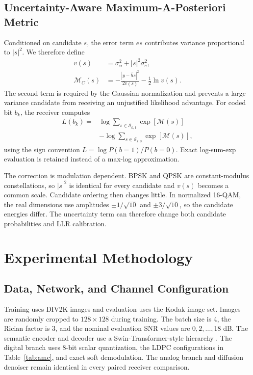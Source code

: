 \documentclass[conference]{IEEEtran}
\newcommand{\LLR}{LLR}
\newcommand{\LDPC}{LDPC}
\begin{document}
\subsection{Uncertainty-Aware Maximum-A-Posteriori Metric}
Conditioned on candidate $s$, the error term $es$ contributes variance proportional to $|s|^2$. We therefore define
\begin{align}
    v(s) &= \sigma_n^2+|s|^2\sigma_e^2,\\
    \mathcal M_C(s)
    &=-\frac{|y-\hat h s|^2}{2v(s)}
      -\frac{1}{2}\ln v(s).
    \label{eq:robust-metric}
\end{align}
The second term is required by the Gaussian normalization and prevents a large-variance candidate from receiving an unjustified likelihood advantage. For coded bit $b_k$, the receiver computes
\begin{equation}
\begin{split}
    L(b_k)=
    &\log\sum_{s\in\mathcal S_{k,1}}
    \exp\left[\mathcal M(s)\right]\\
    &-\log\sum_{s\in\mathcal S_{k,0}}
    \exp\left[\mathcal M(s)\right],
\end{split}
    \label{eq:llr}
\end{equation}
using the sign convention $L=\log P(b=1)/P(b=0)$. Exact log-sum-exp evaluation is retained instead of a max-log approximation.

The correction is modulation dependent. BPSK and QPSK are constant-modulus constellations, so $|s|^2$ is identical for every candidate and $v(s)$ becomes a common scale. Candidate ordering then changes little. In normalized 16-QAM, the real dimensions use amplitudes $\pm1/\sqrt{10}$ and $\pm3/\sqrt{10}$, so the candidate energies differ. The uncertainty term can therefore change both candidate probabilities and \LLR{} calibration.

\section{Experimental Methodology}
\subsection{Data, Network, and Channel Configuration}
Training uses DIV2K images and evaluation uses the Kodak image set. Images are randomly cropped to $128\times128$ during training. The batch size is 4, the Rician factor is 3, and the nominal evaluation SNR values are $0,2,\ldots,18$ dB. The semantic encoder and decoder use a Swin-Transformer-style hierarchy \cite{liu2021swin}. The digital branch uses 8-bit scalar quantization, the \LDPC{} configurations in Table~\ref{tab:amc}, and exact soft demodulation. The analog branch and diffusion denoiser remain identical in every paired receiver comparison.
\end{document}
